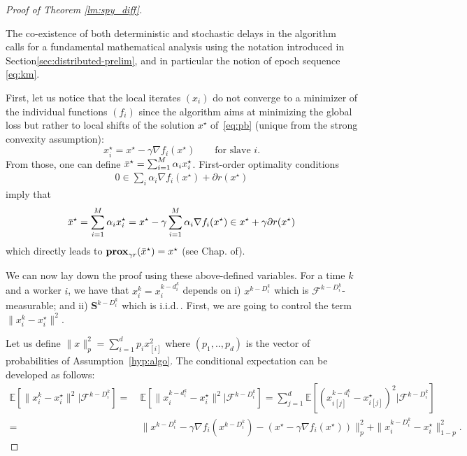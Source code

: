 \begin{proof}[Proof of Theorem \ref{lm:spy_diff}]\label{apx:proofsparse}


The co-existence of both deterministic and stochastic delays in the algorithm calls for a fundamental mathematical analysis using the notation introduced in Section\;\ref{sec:distributed-prelim}, and in particular the notion of epoch sequence \eqref{eq:km}.

First, let us notice that the local iterates $(x_i)$ do not converge to a minimizer of the individual functions $(f_i)$ since the algorithm aims at minimizing the global loss but rather to local shifts of the solution $x^\star$ of~\eqref{eq:pb} (unique from the strong convexity assumption):
\[
x_i^\star = x^\star - \gamma \nabla f_i(x^\star) \qquad \text{for slave $i$}.
\]
From those, one can define $\bar{x}^\star = \sum_{i=1}^M \alpha_i x_i^\star$. First-order optimality conditions 
\begin{align*}
    0\in \sum_i \alpha_i \nabla f_i(x^\star) + \partial r(x^\star)
\end{align*}
imply that 
\[
\bar{x}^\star = \sum_{i=1}^M \alpha_i x_i^\star = x^\star - \gamma \sum_{i=1}^M \alpha_i \nabla f_i(x^\star) \in x^\star  + \gamma \partial r(x^\star)
\]
which directly leads to $\mathbf{prox}_{\gamma r}(\bar{x}^\star) = x^\star$ (see Chap. of\;\cite{bauschke2011convex}).

We can now lay down the proof using these above-defined variables. For a time $k$ and a worker $i$, we have that $x_i^k = x_i^{k-d_i^k}$ depends on i) $x^{k-D_i^k}$ which is $\mathcal{F}^{k-D_i^k}$-measurable; and ii) $\mathbf{S}^{k-D_i^k}$ which is i.i.d.\,. First, we are going to control the term $\|x_i^k - x_i^\star\|^2$.

Let us define $\|x\|_p^2 = \sum_{i=1}^d p_ix_{[i]}^2$ where  $(p_1,..,p_d)$ is the vector of probabilities of Assumption~\ref{hyp:algo}. The conditional  expectation can be developed as follows:
\begin{align*}
    \mathbb{E}[\|x_i^k - x_i^\star\|^2 | \mathcal{F}^{k-D_i^k} ]
    =~ &  \mathbb{E}[\|x_i^{k-d_i^k} - x_i^\star\|^2 | \mathcal{F}^{k-D_i^k} ] = \sum_{j=1}^d  \mathbb{E}[ (x_{i[j]}^{k-d_i^k} - x_{i[j]}^\star)^2 | \mathcal{F}^{k-D_i^k} ] \\ 
    =~ & \| x^{k-D_i^k} - \gamma \nabla f_i(x^{k-D_i^k})  - (  {x}^{\star} - \gamma \nabla f_i(x^\star) ) \|^2_p + \| x_{i}^{k-D_i^k} - {x}_{i}^{\star}\|^2_{1-p}.
\end{align*}



\end{proof}
